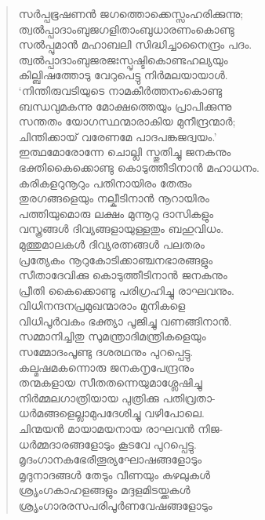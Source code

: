 \begin{verse}
സര്‍പ്പഭൂഷണന്‍ ജഗത്തൊക്കെസ്സംഹരിക്കുന്നു;\\
ത്വല്‍പ്പാദാംബുജഗളിതാംബുധാരണംകൊണ്ടു\\
സല്‍പ്പുമാന്‍ മഹാബലി സിദ്ധിച്ചാനൈന്ദ്രം പദം.\\
ത്വല്‍പ്പാദാംബുജരജഃസ്പൃഷ്ടികൊണ്ടഹല്യയും\\
കില്ബിഷത്തോടു വേറുപെട്ടു നിര്‍മലയായാള്‍.\\
‘നിന്തിരുവടിയുടെ നാമകീര്‍ത്തനംകൊണ്ടു\\
ബന്ധവുമകന്നു മോക്ഷത്തെയും പ്രാപിക്കുന്നു\\
സന്തതം യോഗസ്ഥന്മാരാകിയ മുനീന്ദ്രന്മാര്‍;\\
ചിന്തിക്കായ് വരേണമേ പാദപങ്കജദ്വയം.’\\
ഇത്ഥമോരോന്നേ ചൊല്ലി സ്തുതിച്ചു ജനകനും\\
ഭക്തികൈക്കൊണ്ടു കൊടുത്തീടിനാന്‍ മഹാധനം.\\
കരികളറുനൂറും പതിനായിരം തേരും\\
തുരഗങ്ങളെയും നല്കീടിനാന്‍ നൂറായിരം\\
പത്തിയുമൊരു ലക്ഷം മുന്നൂറു ദാസികളും\\
വസ്ത്രങ്ങള്‍ ദിവ്യങ്ങളായുള്ളതും ബഹുവിധം.\\
മുത്തുമാലകള്‍ ദിവ്യരത്നങ്ങള്‍ പലതരം\\
പ്രത്യേകം നൂറുകോടിക്കാഞ്ചനഭാരങ്ങളും\\
സീതാദേവിക്കു കൊടുത്തീടിനാന്‍ ജനകനും\\
പ്രീതി കൈക്കൊണ്ടു പരിഗ്രഹിച്ചു രാഘവനും.\\
വിധിനന്ദനപ്രമുഖന്മാരാം മുനികളെ\\
വിധിപൂര്‍വകം ഭക്ത്യാ പൂജിച്ചു വണങ്ങിനാന്‍.\\
സമ്മാനിച്ചിതു സുമന്ത്രാദിമന്ത്രികളെയും\\
സമ്മോദംപൂണ്ടു ദശരഥനും പുറപ്പെട്ടു.\\
കല്മഷമകന്നൊരു ജനകനൃപേന്ദ്രനും\\
തന്മകളായ സീതതന്നെയുമാശ്ലേഷിച്ചു\\
നിര്‍മ്മലഗാത്രിയായ പുത്രിക്കു പതിവ്രതാ-\\
ധര്‍മങ്ങളെല്ലാമുപദേശിച്ചു വഴിപോലെ.\\
ചിന്മയന്‍ മായാമയനായ രാഘവന്‍ നിജ-\\
ധര്‍മ്മദാരങ്ങളോടും കൂടവേ പുറപ്പെട്ടു.\\
മൃദംഗാനകഭേരീതൂര്യഘോഷങ്ങളോടും\\
മൃദുനാദങ്ങള്‍ തേടും വീണയും കുഴലുകള്‍\\
ശ്രൃംഗകാഹളങ്ങളും മദ്ദളമിടയ്ക്കകള്‍\\
ശ്രൃംഗാരരസപരിപൂര്‍ണവേഷങ്ങളോടും\\

\end{verse}
